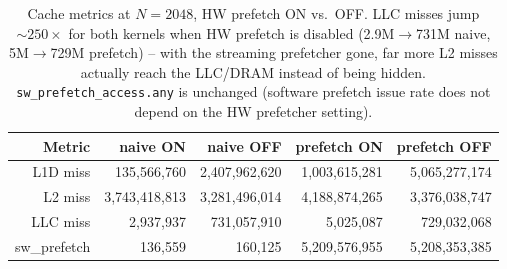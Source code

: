 \documentclass[11pt]{article}
\begin{document}
\begin{table}[H]
    \centering
    \begin{tabular}{rrrrr}
        \toprule
        \textbf{Metric} & \textbf{naive ON} & \textbf{naive OFF} & \textbf{prefetch ON} & \textbf{prefetch OFF} \\
        \midrule
        L1D miss & 135{,}566{,}760 & 2{,}407{,}962{,}620 & 1{,}003{,}615{,}281 & 5{,}065{,}277{,}174 \\
        L2 miss  & 3{,}743{,}418{,}813 & 3{,}281{,}496{,}014 & 4{,}188{,}874{,}265 & 3{,}376{,}038{,}747 \\
        LLC miss & 2{,}937{,}937 & 731{,}057{,}910 & 5{,}025{,}087 & 729{,}032{,}068 \\
        sw\_prefetch & 136{,}559 & 160{,}125 & 5{,}209{,}576{,}955 & 5{,}208{,}353{,}385 \\
        \bottomrule
    \end{tabular}
    \caption{Cache metrics at $N=2048$, HW prefetch ON vs.\ OFF. LLC misses
    jump $\sim\!250\times$ for both kernels when HW prefetch is disabled
    (2.9M$\to$731M naive, 5M$\to$729M prefetch) -- with the streaming
    prefetcher gone, far more L2 misses actually reach the LLC/DRAM instead
    of being hidden. \texttt{sw\_prefetch\_access.any} is unchanged (software
    prefetch issue rate does not depend on the HW prefetcher setting).}
    \label{tab:t2-hwpf-cache}
\end{table}
\end{document}
